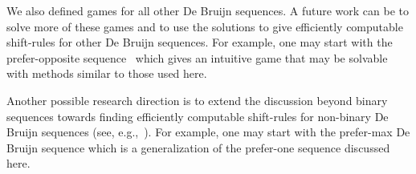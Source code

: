 \documentclass[final,12pt]{elsarticle}
\theoremstyle{definition} \newtheorem{definition}[theorem]{Definition} \newtheorem{observation}[theorem]{Observation} \newtheorem{example}[theorem]{Example} \newtheorem{remark}[theorem]{Remark} \newtheorem{corrolary}[theorem]{Corrolary}
\begin{document}
We also defined games for all other De Bruijn sequences. A future work can be to solve more of these games and to use the solutions to give efficiently computable shift-rules for other De Bruijn sequences. For example, one may start with the prefer-opposite sequence~\cite{alhakim2010simple} which gives an intuitive game that may be solvable with methods similar to those used here.

Another possible research direction is to extend the discussion beyond binary sequences towards finding efficiently computable shift-rules for non-binary De Bruijn sequences (see, e.g.,~\cite{SAWADA2017524}). For example, one may start with the prefer-max De Bruijn sequence which is a generalization of the prefer-one sequence discussed here.  
	
	


\end{document}
